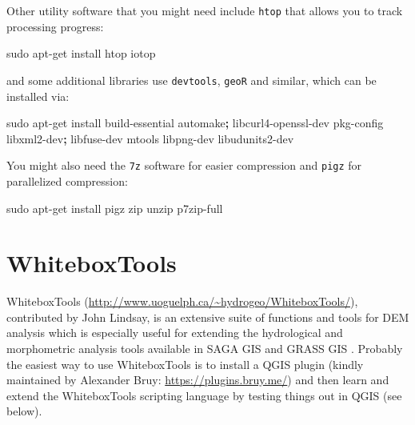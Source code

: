 \documentclass[11pt]{krantz}
\newenvironment{Shaded}{\begin{snugshade}}{\end{snugshade}}
\newcommand{\ExtensionTok}[1]{#1}
\newcommand{\FunctionTok}[1]{\textcolor[rgb]{0,0,0}{#1}}
\newcommand{\KeywordTok}[1]{\textcolor[rgb]{0.27,0.27,0.27}{\textbf{#1}}}
\newcommand{\NormalTok}[1]{#1}
\theoremstyle{definition}
\theoremstyle{definition}
\theoremstyle{definition}
\theoremstyle{remark}
\begin{document}
Other utility software that you might need include \texttt{htop} that
allows you to track processing progress:

\begin{Shaded}
\begin{Highlighting}[]
\FunctionTok{sudo}\NormalTok{ apt-get install htop iotop}
\end{Highlighting}
\end{Shaded}

and some additional libraries use \texttt{devtools}, \texttt{geoR} and
similar, which can be installed via:

\begin{Shaded}
\begin{Highlighting}[]
\FunctionTok{sudo}\NormalTok{ apt-get install build-essential automake}\KeywordTok{;} 
        \ExtensionTok{libcurl4-openssl-dev}\NormalTok{ pkg-config libxml2-dev}\KeywordTok{;}
        \ExtensionTok{libfuse-dev}\NormalTok{ mtools libpng-dev libudunits2-dev}
\end{Highlighting}
\end{Shaded}

You might also need the \texttt{7z} software for easier compression and
\texttt{pigz} for parallelized compression:

\begin{Shaded}
\begin{Highlighting}[]
\FunctionTok{sudo}\NormalTok{ apt-get install pigz zip unzip p7zip-full }
\end{Highlighting}
\end{Shaded}

\hypertarget{Whitebox}{%
\section{WhiteboxTools}\label{Whitebox}}

WhiteboxTools (\url{http://www.uoguelph.ca/~hydrogeo/WhiteboxTools/}),
contributed by John Lindsay, is an extensive suite of functions and
tools for DEM analysis which is especially useful for extending the
hydrological and morphometric analysis tools available in SAGA GIS and
GRASS GIS \citep{lindsay2016whitebox}. Probably the easiest way to use
WhiteboxTools is to install a QGIS plugin (kindly maintained by
Alexander Bruy: \url{https://plugins.bruy.me/}) and then learn and
extend the WhiteboxTools scripting language by testing things out in
QGIS (see below).
\end{document}
